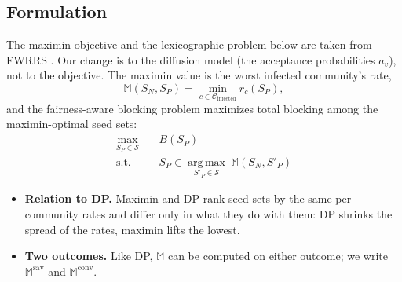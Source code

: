 
\subsection{Formulation}
The maximin objective and the lexicographic problem below are taken from FWRRS \cite{fwrrs}. Our change is to the diffusion model (the acceptance probabilities $a_v$), not to the objective. The maximin value is the worst infected community's rate,
\begin{equation}
\mathbb{M}(S_N,S_P) = \min_{c \in \mathcal{C}_{\mathrm{infected}}} r_c(S_P),
\end{equation}
and the fairness-aware blocking problem maximizes total blocking among the maximin-optimal seed sets:
\begin{equation}
\begin{aligned}
\max_{S_P \in \mathcal{S}}\quad & B(S_P) \\
\text{s.t.}\quad & S_P \in \operatorname*{arg\,max}_{S'_P \in \mathcal{S}}\ \mathbb{M}(S_N,S'_P)
\end{aligned}
\end{equation}
\begin{itemize}
\item \textbf{Relation to DP.} Maximin and DP rank seed sets by the same per-community rates and differ only in what they do with them: DP shrinks the spread of the rates, maximin lifts the lowest.
\item \textbf{Two outcomes.} Like DP, $\mathbb{M}$ can be computed on either outcome; we write $\mathbb{M}^{\mathrm{sav}}$ and $\mathbb{M}^{\mathrm{conv}}$.
\end{itemize}

